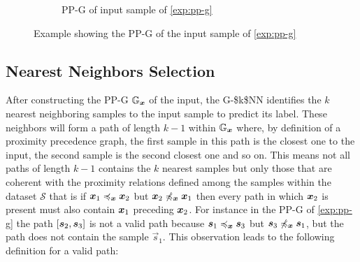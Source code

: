 \begin{example}
\begin{figure}[h]
\begin{subfigure}{0.4\linewidth}
      \captionsetup{justification=centering}
      \caption{PP-G of input sample of \autoref{exp:pp-g}}
     \label{subfig:pp-G-fig}
    \end{subfigure}

    \caption[Example showing a \acs{PP-G}]{Example showing the \acs{PP-G} of the input sample of \autoref{exp:pp-g}}
    \label{fig:pp-g-example}
  \end{figure}
\end{example}

\subsection{Nearest Neighbors Selection}
\label{subsec:selection-k-nearest-neighbor}

After constructing the \acs{PP-G} $\mathbb{G}_{\vinput}$ of the input, the \acs{G-$k$NN} identifies the $k$ nearest neighboring samples to the input sample to predict its label. These neighbors will form a path of length $k-1$ within $\mathbb{G}_{\vinput}$ where, by definition of a proximity precedence graph, the first sample in this path is the closest one to the input, the second sample is the second closest one and so on. This means not all paths of length $k-1$ contains the $k$ nearest samples but only those that are coherent with the proximity relations defined among the samples within the dataset $\mathcal{S}$ that is if $\pre{\x[1]}{\x[2]}$ but $\npre{\x[2]}{\x[1]}$ then every path in which $\x[2]$ is present must also contain $\x[1]$ preceding $\x[2]$. For instance in the \acs{PP-G} of \autoref{exp:pp-g} the path $[\sample[2], \sample[3]]$ is not a valid path because $\pre{\sample[1]}{\sample[3]}$ but $\npre{\sample[3]}{\sample[1]}$, but the path does not contain the sample $\vec{s}_1$. This observation leads to the following definition for a valid path:

